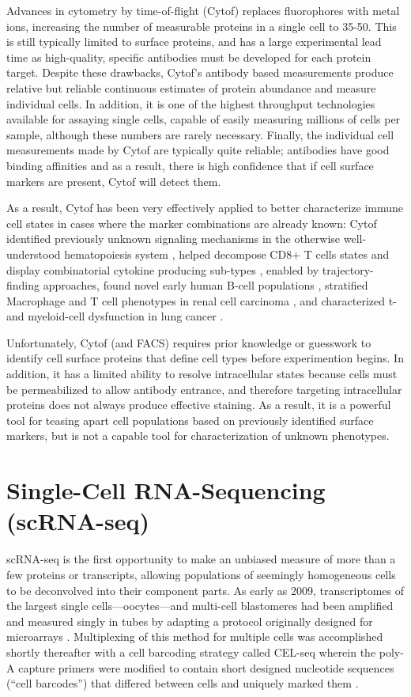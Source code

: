Advances in cytometry by time-of-flight (Cytof) replaces fluorophores with metal ions, increasing the number of measurable proteins in a single cell to 35-50. 
This is still typically limited to surface proteins, and has a large experimental lead time as high-quality, specific antibodies must be developed for each protein target.  
Despite these drawbacks, Cytof’s antibody based measurements produce relative but reliable continuous estimates of protein abundance and measure individual cells. 
In addition, it is one of the highest throughput technologies available for assaying single cells, capable of easily measuring millions of cells per sample, although these numbers are rarely necessary. 
Finally, the individual cell measurements made by Cytof are typically quite reliable; antibodies have good binding affinities and as a result, there is high confidence that if cell surface markers are present, Cytof will detect them. 

As a result, Cytof has been very effectively applied to better characterize immune cell states in cases where the marker combinations are already known: 
Cytof identified previously unknown signaling mechanisms in the otherwise well-understood hematopoiesis system \citep{Bendall2011}, helped decompose CD8+ T cells states and display combinatorial cytokine producing sub-types \citep{Newell2012}, enabled by trajectory-finding approaches, found novel early human B-cell populations \citep{Bendall2014}, stratified Macrophage and T cell phenotypes in renal cell carcinoma \citep{Chevrier2017}, and characterized t- and myeloid-cell dysfunction in lung cancer \citep{Lavin2017}.

Unfortunately, Cytof (and FACS) requires prior knowledge or guesswork to identify cell surface proteins that define cell types before experimention begins. 
In addition, it has a limited ability to resolve intracellular states because cells must be permeabilized to allow antibody entrance, and therefore targeting intracellular proteins does not always produce effective staining. 
As a result, it is a powerful tool for teasing apart cell populations based on previously identified surface markers, but is not a capable tool for characterization of unknown phenotypes.

\section{Single-Cell RNA-Sequencing (scRNA-seq)}

scRNA-seq is the first opportunity to make an unbiased measure of more than a few proteins or transcripts, allowing populations of seemingly homogeneous cells to be deconvolved into their component parts. 
As early as 2009, transcriptomes of the largest single cells---oocytes---and multi-cell blastomeres had been amplified and measured singly in tubes by adapting a protocol originally designed for microarrays \citep{Tang2009}. 
Multiplexing of this method for multiple cells was accomplished shortly thereafter with a cell barcoding strategy called CEL-seq wherein the poly-A capture primers were modified to contain short designed nucleotide sequences (``cell barcodes'') that differed between cells and uniquely marked them \citep{Islam2011}. 

